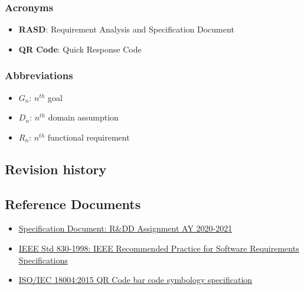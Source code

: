 \subsubsection{Acronyms}
\begin{itemize}
    \item \textbf{RASD}: Requirement Analysis and Specification Document
    \item \textbf{QR Code}: Quick Response Code
\end{itemize}
\subsubsection{Abbreviations}
\begin{itemize}
    \item \textbf{$G_n$}: $n^{th}$ goal
    \item \textbf{$D_n$}: $n^{th}$ domain assumption
    \item \textbf{$R_n$}: $n^{th}$ functional requirement
\end{itemize}
\subsection{Revision history}


\subsection{Reference Documents}
\begin{itemize}
    \item \href{https://beep.metid.polimi.it/documents/121843524/23d1869d-ab17-4e36-979e-f1ccbc59be24}{Specification Document: R\&DD Assignment AY 2020-2021}
    \item \href{https://standards.ieee.org/standard/29148-2011.html}{IEEE Std 830-1998: IEEE Recommended Practice for Software Requirements Specifications}
    \item \href{https://www.iso.org/standard/62021.html}{ISO/IEC 18004:2015 QR Code bar code symbology specification}
\end{itemize}


